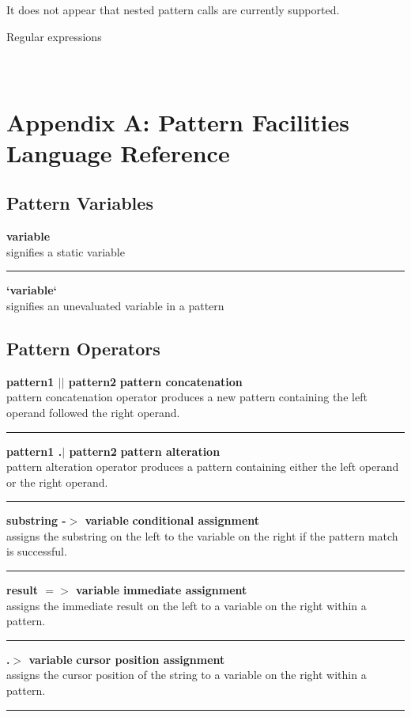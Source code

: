 \documentclass{article}
\begin{document}
It does not appear that nested pattern calls are currently supported.

Regular expressions


\newpage
\appendix
\section{\\Appendix A: Pattern Facilities Language Reference} \label{App:AppendixA}
\subsection{Pattern Variables}
\textbf{variable} \\
signifies a static variable\\
\noindent\rule{12cm}{0.4pt}
 
\noindent\textbf{`variable`} \\
signifies an unevaluated variable in a pattern\\

\subsection{Pattern Operators}
\noindent\textbf{pattern1 $\vert\vert$	pattern2} \hfill \textbf{pattern concatenation}\\
pattern concatenation operator produces a new pattern containing the left operand followed the right operand.\\
\noindent\rule{12cm}{0.4pt}

\noindent\textbf{pattern1 .$\vert$ pattern2} \hfill \textbf{pattern alteration}\\
pattern alteration operator produces a pattern containing either the left operand or the right operand.\\
\noindent\rule{12cm}{0.1pt}

\noindent\textbf{substring -$>$ variable} \hfill\textbf{conditional assignment}\\
assigns the substring on the left to the variable on the right if the pattern match is successful.\\
\noindent\rule{12cm}{0.1pt}

\noindent\textbf{result $=>$ variable} \hfill\textbf{immediate assignment}\\
assigns the immediate result on the left to a variable on the right within a pattern.\\
\noindent\rule{12cm}{0.1pt}

\noindent\textbf{.$>$ variable} \hfill\textbf{cursor position assignment}\\
assigns the cursor position of the string to a variable on the right within a pattern.\\
\noindent\rule{12cm}{0.1pt}
\end{document}
